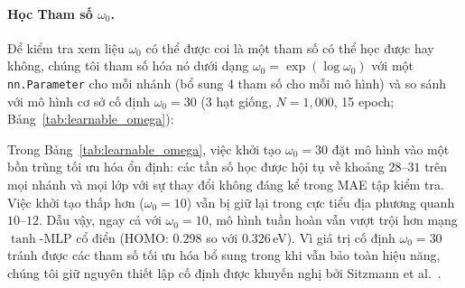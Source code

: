 \documentclass[10pt,twocolumn,letterpaper]{article}
\begin{document}
\paragraph{Học Tham số $\omega_0$.}
Để kiểm tra xem liệu $\omega_0$ có thể được coi là một tham số có thể học được hay không, chúng tôi tham số hóa nó dưới dạng $\omega_0 = \exp(\log \omega_0)$ với một \texttt{nn.Parameter} cho mỗi nhánh (bổ sung 4 tham số cho mỗi mô hình) và so sánh với mô hình cơ sở cố định $\omega_0 = 30$ (3 hạt giống, $N = 1{,}000$, 15 epoch; Bảng~\ref{tab:learnable_omega}):

\begin{table}[ht]
\centering
\small
\caption{\textbf{Thí nghiệm Tham số $\omega_0$ có thể Học} ($N = 1{,}000$, 3 hạt giống). MAE tập kiểm tra (eV). Khi khởi tạo ở 30, $\omega_0$ học được hội tụ về $28$--$31$ trên mọi nhánh và lớp, khớp với hiệu năng của $\omega_0 = 30$ cố định. Khi khởi tạo ở 10, $\omega_0$ duy trì gần $10$--$12$ và không thoát ra để đến bồn trũng $\omega_0 \approx 30$ ưu việt hơn.}
\label{tab:learnable_omega}
\end{table}

Trong Bảng~\ref{tab:learnable_omega}, việc khởi tạo $\omega_0 = 30$ đặt mô hình vào một bồn trũng tối ưu hóa ổn định: các tần số học được hội tụ về khoảng $28$--$31$ trên mọi nhánh và mọi lớp với sự thay đổi không đáng kể trong MAE tập kiểm tra. Việc khởi tạo thấp hơn ($\omega_0 = 10$) vẫn bị giữ lại trong cực tiểu địa phương quanh $10$--$12$. Dẫu vậy, ngay cả với $\omega_0 = 10$, mô hình tuần hoàn vẫn vượt trội hơn mạng $\tanh$-MLP cổ điển (HOMO: $0.298$ so với $0.326$\,eV). Vì giá trị cố định $\omega_0 = 30$ tránh được các tham số tối ưu hóa bổ sung trong khi vẫn bảo toàn hiệu năng, chúng tôi giữ nguyên thiết lập cố định được khuyến nghị bởi Sitzmann et al.~\cite{sitzmann2020siren}.
\end{document}
